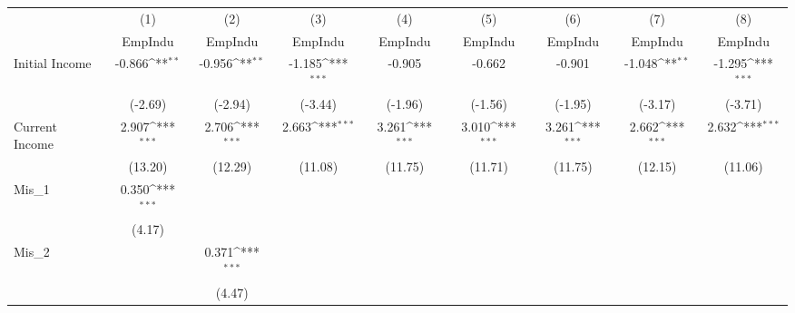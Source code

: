 \documentclass{article}
\begin{document}
{
\def\sym#1{\ifmmode^{#1}\else\(^{#1}\)\fi}
\begin{tabular}{l*{8}{c}}
\hline\hline
            &\multicolumn{1}{c}{(1)}&\multicolumn{1}{c}{(2)}&\multicolumn{1}{c}{(3)}&\multicolumn{1}{c}{(4)}&\multicolumn{1}{c}{(5)}&\multicolumn{1}{c}{(6)}&\multicolumn{1}{c}{(7)}&\multicolumn{1}{c}{(8)}\\
            &\multicolumn{1}{c}{EmpIndu}&\multicolumn{1}{c}{EmpIndu}&\multicolumn{1}{c}{EmpIndu}&\multicolumn{1}{c}{EmpIndu}&\multicolumn{1}{c}{EmpIndu}&\multicolumn{1}{c}{EmpIndu}&\multicolumn{1}{c}{EmpIndu}&\multicolumn{1}{c}{EmpIndu}\\
\hline
Initial Income    &      -0.866\sym{**} &      -0.956\sym{**} &      -1.185\sym{***}&      -0.905         &      -0.662         &      -0.901         &      -1.048\sym{**} &      -1.295\sym{***}\\
            &     (-2.69)         &     (-2.94)         &     (-3.44)         &     (-1.96)         &     (-1.56)         &     (-1.95)         &     (-3.17)         &     (-3.71)         \\
[1em]
Current Income &       2.907\sym{***}&       2.706\sym{***}&       2.663\sym{***}&       3.261\sym{***}&       3.010\sym{***}&       3.261\sym{***}&       2.662\sym{***}&       2.632\sym{***}\\
            &     (13.20)         &     (12.29)         &     (11.08)         &     (11.75)         &     (11.71)         &     (11.75)         &     (12.15)         &     (11.06)         \\
[1em]
Mis\_1       &       0.350\sym{***}&                     &                     &                     &                     &                     &                     &                     \\
            &      (4.17)         &                     &                     &                     &                     &                     &                     &                     \\
[1em]
Mis\_2       &                     &       0.371\sym{***}&                     &                     &                     &                     &                     &                     \\
            &                     &      (4.47)         &                     &                     &                     &                     &                     &                     \\

\end{tabular}}
\end{document}
